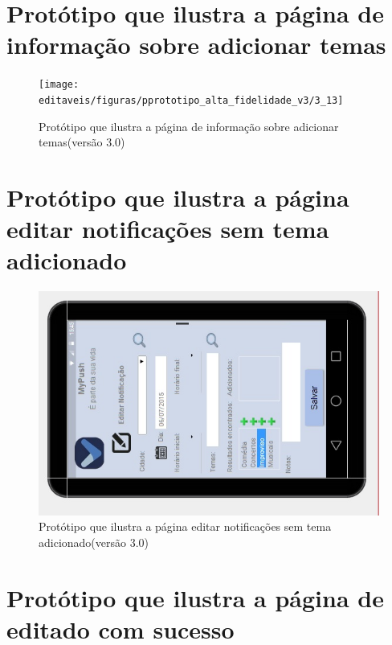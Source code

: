 \begin{apendicesenv}
      \section*{Protótipo que ilustra a página de informação sobre adicionar temas}

    \begin{figure}[!htbp]
      \centering
      \texttt{[image: editaveis/figuras/pprototipo\_alta\_fidelidade\_v3/3\_13]}
      \caption{Protótipo que ilustra a página de informação sobre adicionar temas(versão 3.0)}
      \label{v3}
    \end{figure}
    
      \section*{Protótipo que ilustra a página editar notificações sem tema adicionado}

    \begin{figure}[!htbp]
      \centering
      \includegraphics[scale=0.5, angle=-90]{editaveis/figuras/prototipo_alta_fidelidade_v3/3_14}
      \caption{Protótipo que ilustra a página editar notificações sem tema adicionado(versão 3.0)}
      \label{v3}
    \end{figure}
    
      \section*{Protótipo que ilustra a página de editado com sucesso}


\end{apendicesenv}

